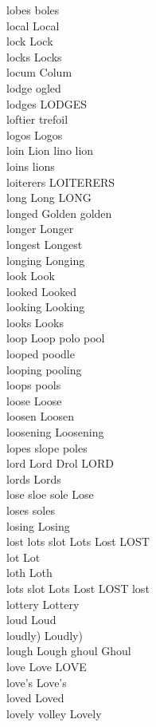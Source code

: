 lobes boles\\
local Local\\
lock Lock\\
locks Locks\\
locum Colum\\
lodge ogled\\
lodges LODGES\\
loftier trefoil\\
logos Logos\\
loin Lion lino lion\\
loins lions\\
loiterers LOITERERS\\
long Long LONG\\
longed Golden golden\\
longer Longer\\
longest Longest\\
longing Longing\\
look Look\\
looked Looked\\
looking Looking\\
looks Looks\\
loop Loop polo pool\\
looped poodle\\
looping pooling\\
loops pools\\
loose Loose\\
loosen Loosen\\
loosening Loosening\\
lopes slope poles\\
lord Lord Drol LORD\\
lords Lords\\
lose sloe sole Lose\\
loses soles\\
losing Losing\\
lost lots slot Lots Lost LOST\\
lot Lot\\
loth Loth\\
lots slot Lots Lost LOST lost\\
lottery Lottery\\
loud Loud\\
loudly) Loudly)\\
lough Lough ghoul Ghoul\\
love Love LOVE\\
love's Love's\\
loved Loved\\
lovely volley Lovely\\
